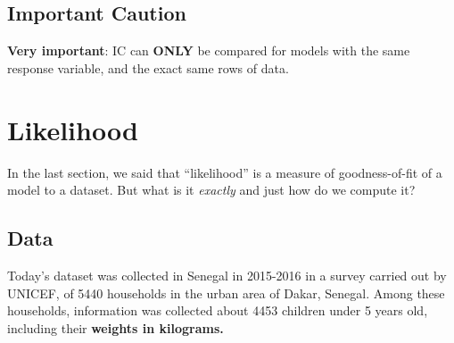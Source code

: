 \documentclass[]{book}
\newenvironment{Shaded}{\begin{snugshade}}{\end{snugshade}}
\newcommand{\CharTok}[1]{\textcolor[rgb]{0.31,0.60,0.02}{#1}}
\newcommand{\DataTypeTok}[1]{\textcolor[rgb]{0.13,0.29,0.53}{#1}}
\newcommand{\DecValTok}[1]{\textcolor[rgb]{0.00,0.00,0.81}{#1}}
\newcommand{\FloatTok}[1]{\textcolor[rgb]{0.00,0.00,0.81}{#1}}
\newcommand{\KeywordTok}[1]{\textcolor[rgb]{0.13,0.29,0.53}{\textbf{#1}}}
\newcommand{\NormalTok}[1]{#1}
\newcommand{\OperatorTok}[1]{\textcolor[rgb]{0.81,0.36,0.00}{\textbf{#1}}}
\newcommand{\StringTok}[1]{\textcolor[rgb]{0.31,0.60,0.02}{#1}}
\begin{document}
\hypertarget{important-caution}{%
\section{Important Caution}\label{important-caution}}

\textbf{Very important}: IC can \textbf{ONLY} be compared for models with the same response variable, and the exact same rows of data.

\hypertarget{likelihood}{%
\chapter{Likelihood}\label{likelihood}}

In the last section, we said that ``likelihood'' is a measure of goodness-of-fit of a model to a dataset. But what is it \emph{exactly} and just how do we compute it?

\hypertarget{data-1}{%
\section{Data}\label{data-1}}

Today's dataset was collected in Senegal in 2015-2016 in a survey carried out by UNICEF, of 5440 households in the urban area of Dakar, Senegal. Among these households, information was collected about 4453 children under 5 years old, including their \textbf{weights in kilograms.}

\begin{Shaded}
\end{Shaded}
\end{document}
